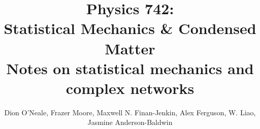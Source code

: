 \documentclass{article}
\begin{document}
\newcommand{\calG}{\mathcal{G}}
\title{Physics 742: \\
	Statistical Mechanics \& Condensed Matter\\
	Notes on statistical mechanics and complex networks}

\author{Dion O'Neale, Frazer Moore, Maxwell N. Finan-Jenkin, Alex Ferguson, W. Liao, Jasmine Anderson-Baldwin}

\maketitle
\newpage
\tableofcontents
\newpage












\end{document}
